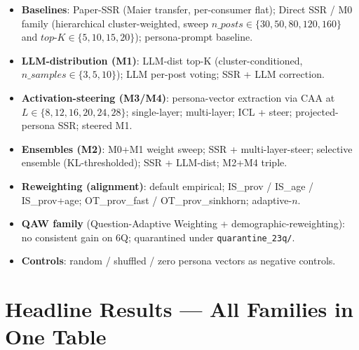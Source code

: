 \documentclass[10pt,a4paper]{article}
\begin{document}
\begin{itemize}[leftmargin=*,itemsep=1pt]
\item \textbf{Baselines}: Paper-SSR (Maier transfer, per-consumer flat); Direct SSR / M0 family (hierarchical cluster-weighted, sweep $n\_posts\in\{30,50,80,120,160\}$ and $top\text{-}K\in\{5,10,15,20\}$); persona-prompt baseline.
\item \textbf{LLM-distribution (M1)}: LLM-dist top-K (cluster-conditioned, $n\_samples\in\{3,5,10\}$); LLM per-post voting; SSR + LLM correction.
\item \textbf{Activation-steering (M3/M4)}: persona-vector extraction via CAA at $L\in\{8,12,16,20,24,28\}$; single-layer; multi-layer; ICL + steer; projected-persona SSR; steered M1.
\item \textbf{Ensembles (M2)}: M0+M1 weight sweep; SSR + multi-layer-steer; selective ensemble (KL-thresholded); SSR + LLM-dist; M2+M4 triple.
\item \textbf{Reweighting (alignment)}: default empirical; IS\_prov / IS\_age / IS\_prov+age; OT\_prov\_fast / OT\_prov\_sinkhorn; adaptive-$n$.
\item \textbf{QAW family} (Question-Adaptive Weighting + demographic-reweighting): no consistent gain on 6Q; quarantined under \texttt{quarantine\_23q/}.
\item \textbf{Controls}: random / shuffled / zero persona vectors as negative controls.
\end{itemize}

\section{Headline Results — All Families in One Table}
\end{document}
